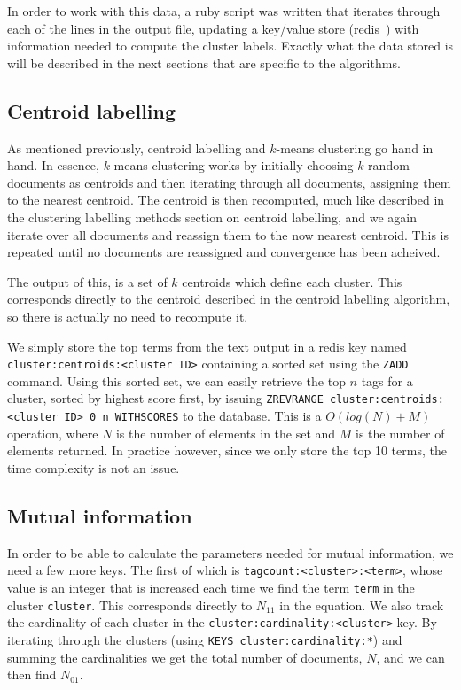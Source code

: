 \documentclass[letterpaper, 10 pt, conference]{ieeeconf}
\begin{document}
In order to work with this data, a ruby script was written that iterates through
each of the lines in the output file, updating a key/value store
(redis~\cite{redis}) with information needed to compute the cluster labels.
Exactly what the data stored is will be described in the next sections that are
specific to the algorithms.

\subsection{Centroid labelling}
As mentioned previously, centroid labelling and $k$-means clustering go hand in
hand. In essence, $k$-means clustering works by initially choosing $k$ random
documents as centroids and then iterating through all documents, assigning them
to the nearest centroid. The centroid is then recomputed, much like described in
the clustering labelling methods section on centroid labelling, and we again
iterate over all documents and reassign them to the now nearest centroid. This
is repeated until no documents are reassigned and convergence has been acheived.

The output of this, is a set of $k$ centroids which define each cluster. This
corresponds directly to the centroid described in the centroid labelling
algorithm, so there is actually no need to recompute it.

We simply store the top terms from the text output in a redis key named
\texttt{cluster:centroids:<cluster ID>} containing a sorted set using the
\texttt{ZADD} command. Using this sorted set, we can easily retrieve the top $n$
tags for a cluster, sorted by highest score first, by issuing \texttt{ZREVRANGE
cluster:centroids:<cluster ID> 0 n WITHSCORES} to the database. This is a
$O(log(N)+M)$ operation, where $N$ is the number of elements in the set and $M$
is the number of elements returned. In practice however, since we only store the
top 10 terms, the time complexity is not an issue.

\subsection{Mutual information}
In order to be able to calculate the parameters needed for mutual information,
we need a few more keys. The first of which is
\texttt{tagcount:<cluster>:<term>}, whose value is an integer that is increased
each time we find the term \texttt{term} in the cluster \texttt{cluster}. This
corresponds directly to $N_{11}$ in the equation. We also track the cardinality
of each cluster in the \texttt{cluster:cardinality:<cluster>} key. By iterating
through the clusters (using \texttt{KEYS cluster:cardinality:*}) and summing the
cardinalities we get the total number of documents, $N$, and we can then find
$N_{01}$.
\end{document}

